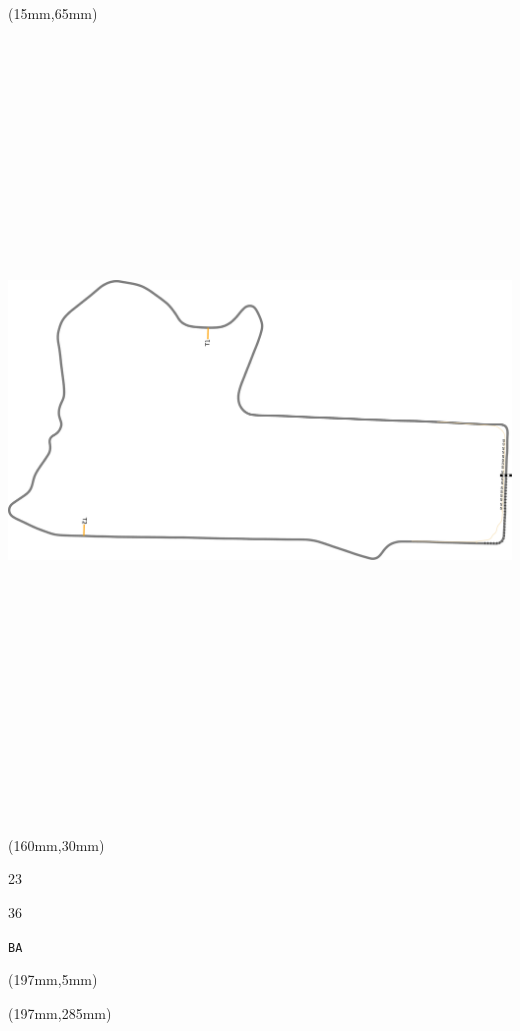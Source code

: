 \begin{textblock*}{185mm}(15mm,65mm)%
\centering
\mbox{\includegraphics[width=185mm,height=210mm,keepaspectratio]{PT/BA.pdf}}
\end{textblock*}
\begin{textblock*}{40mm}(160mm,30mm)%
\Large
\par{} 
\par23 
\par36 
\par\hfill\tiny\tt BA\\
\end{textblock*}
\begin{textblock*}{20mm}(197mm,5mm)%
\fbox{\thepage}
\label{BA}
\end{textblock*}
\begin{textblock*}{20mm}(197mm,285mm)%
\fbox{\thepage}
\end{textblock*}

